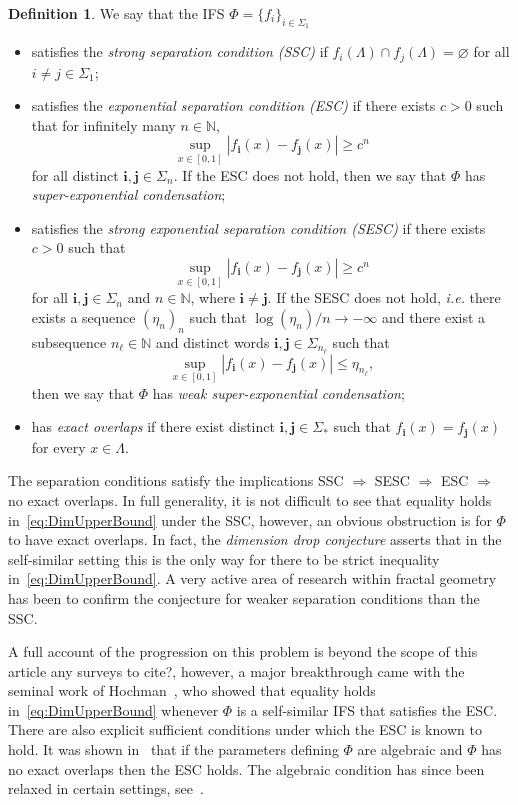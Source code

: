 \documentclass[12pt,]{article}
\theoremstyle{definition}
\newtheorem{definition}[theorem]{Definition}
\theoremstyle{remark}
\renewcommand{\Bbb}[1]{\mathbb{#1}}
\newcommand{\bbN}{{\Bbb N}}         %
\newcommand{\0}{\mathbf{0}}
\newcommand{\ie}{{\it i.e.}\/ }
\newcommand{\bi}{\mathbf{i}}
\newcommand{\bj}{\mathbf{j}}
\begin{document}
{\begin{definition}\label{def:SeparationConds}
We say that the IFS $\Phi=\{f_i\}_{i\in\Sigma_1}$ 
\begin{itemize}
	\item satisfies the \emph{strong separation condition (SSC)} if $f_i(\Lambda)\cap f_j(\Lambda)=\varnothing$ for all $i\neq j\in\Sigma_1$; 
	\item satisfies the \emph{exponential separation condition (ESC)} if there exists $c>0$ such that for infinitely many $n\in\mathbb{N}$,
	\[
	\sup_{x\in[0,1]} |f_{\bi}(x)-f_{\bj}(x)| \geq c^n
	\]
	for all distinct $\bi,\bj\in\Sigma_n$. If the ESC does not hold,
	then we say that $\Phi$ has \emph{super-exponential condensation}; 	
	\item satisfies the \emph{strong exponential separation condition (SESC)} if there exists $c>0$ such that
	\[
	\sup_{x\in[0,1]} |f_{\bi}(x)-f_{\bj}(x)| \geq c^n
	\]
	for all $\bi,\bj\in\Sigma_n$ and $n\in\bbN$, where $\bi\neq\bj$. If the SESC does not hold, \ie there exists a sequence $(\eta_n)_n$ such that $\log(\eta_n)/n\to-\infty$ and there exist a subsequence $n_{\ell}\in\bbN$ and distinct words $\bi,\bj\in\Sigma_{n_\ell}$ such that
	\[
	\sup_{x\in[0,1]}|f_{\bi}(x)-f_{\bj}(x)| \leq \eta_{n_\ell},
	\]
	then we say that $\Phi$ has \emph{weak super-exponential condensation}; 
	\item has \emph{exact overlaps} if there exist distinct $\bi,\bj\in\Sigma_*$ such that $f_{\bi}(x)=f_{\bj}(x)$ for every $x\in\Lambda$. 
\end{itemize}
\end{definition}

The separation conditions satisfy the implications SSC $\Rightarrow$ SESC $\Rightarrow$ ESC
$\Rightarrow$ no exact overlaps. In full generality, it is not difficult to see that equality holds
in~\cref{eq:DimUpperBound} under the SSC, however, an obvious obstruction is for $\Phi$ to have
exact overlaps. In fact, the \emph{dimension drop conjecture} asserts that in the self-similar setting this is the only way for there to be strict inequality in~\cref{eq:DimUpperBound}. A very active area of research within fractal geometry has been to confirm the conjecture for weaker separation conditions than the SSC. 

A full account of the progression on this problem is beyond the scope of this article {\color{red}any surveys to cite?}, however, a major breakthrough came with the seminal work of Hochman~\cite{Hochman_SelfSimESC_Annals}, who showed that equality holds in~\cref{eq:DimUpperBound} whenever $\Phi$ is a self-similar IFS that satisfies the ESC. There are also explicit sufficient conditions under which the ESC is known to hold. It was shown in~\cite{Hochman_SelfSimESC_Annals} that if the parameters defining $\Phi$ are algebraic and $\Phi$ has no exact overlaps then the ESC holds. The algebraic condition has since been relaxed in certain settings, see~\cite{FengFeng_DimHomoIFSAlgebraicTrans_arxiv, Rapaport_ExactOverlapsAlgebraicContr, RapaportVarju_Duke24, Varju_BernConv_Annals19}.



}
\end{document}
